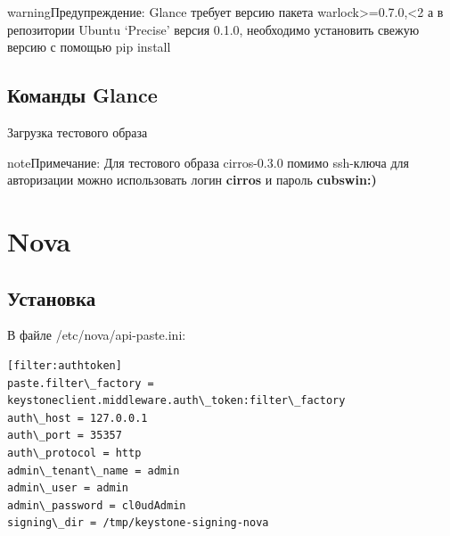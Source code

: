 \documentclass[letterpaper,10pt,russian]{sphinxmanual}
\begin{document}



\begin{notice}{warning}{Предупреждение:}
Glance требует версию пакета warlock\textgreater{}=0.7.0,\textless{}2 а в репозитории Ubuntu `Precise' версия 0.1.0, необходимо установить свежую версию с помощью pip install
\end{notice}




\section{Команды Glance}
\label{README:id12}
Загрузка тестового образа


\begin{notice}{note}{Примечание:}
Для тестового образа cirros-0.3.0 помимо ssh-ключа для авторизации можно использовать  логин \textbf{cirros} и пароль \textbf{cubswin:)}
\end{notice}


\chapter{Nova}
\label{README:id13}\label{README:nova}

\section{Установка}
\label{README:id14}


В файле /etc/nova/api-paste.ini:

\begin{Verbatim}[commandchars=\\\{\}]
[filter:authtoken]
paste.filter\_factory = keystoneclient.middleware.auth\_token:filter\_factory
auth\_host = 127.0.0.1
auth\_port = 35357
auth\_protocol = http
admin\_tenant\_name = admin
admin\_user = admin
admin\_password = cl0udAdmin
signing\_dir = /tmp/keystone-signing-nova
\end{Verbatim}
\end{document}
